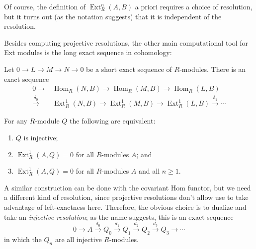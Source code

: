 \documentclass[10pt]{article}
\providecommand{\ii}{\item}
\providecommand{\opname}{\operatorname}
\providecommand{\vocab}[1]{{{\sffamily\textit{#1}}}}
\providecommand{\Ext}{\operatorname{Ext}}
\renewcommand{\hom}{\opname{Hom}}
\newcommand{\longto}{\longrightarrow}
\begin{document}
Of course, the definition of $\Ext_R^n(A,B)$
a priori requires a choice of resolution,
but it turns out (as the notation suggests)
that it is independent of the resolution.


Besides computing projective resolutions,
the other main computational tool for Ext modules
is the long exact sequence in cohomology:
\begin{theorem}
    \label{thm:ext-long-exact-sequence}
    Let $0\to L\to M\to N\to 0$ be a short exact sequence of $R$-modules.
    There is an exact sequence
    \begin{align*}
	0\to&\hom_R(N,B)\to\hom_R(M,B)\to\hom_R(L,B)\\
	\overset{\delta_0}\longto
	&\Ext^1_R(N,B)\to\Ext^1_R(M,B)\to\Ext^1_R(L,B)
	\overset{\delta_1}\longto\cdots
    \end{align*}
\end{theorem}

\begin{prop}
    \label{prop:injectivity-criterion}
    For any $R$-module $Q$ the following are equivalent:
    \begin{enumerate}[(1)]
        \ii $Q$ is injective;
	\ii $\Ext_R^1(A,Q) = 0$ for all $R$-modules $A$; and
	\ii $\Ext_R^1(A,Q) = 0$ for all $R$-modules $A$ and all $n\ge 1$.
    \end{enumerate}
\end{prop}

A similar construction can be done with the covariant Hom functor,
but we need a different kind of resolution,
since projective resolutions don't allow use to take advantage
of left-exactness here. Therefore, the obvious choice is to dualize and
take an \vocab{injective resolution};
as the name suggests, this is an exact sequence
\begin{equation*}
    0\longto A\overset{d_0}\longto Q_0\overset{d_1}\longto Q_1
    \overset{d_2}\longto Q_2\overset{d_3}\longto Q_3\longto\cdots
\end{equation*}
in which the $Q_n$ are all injective $R$-modules.
\end{document}
